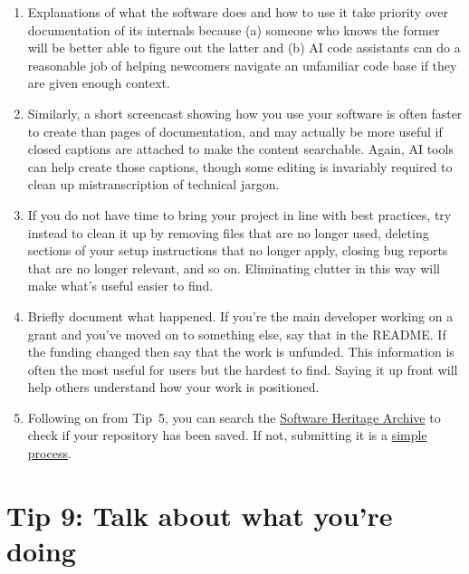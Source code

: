 \documentclass[10pt,letterpaper]{article}
\begin{document}
\begin{enumerate}

\item
  Explanations of what the software does and how to use it
  take priority over documentation of its internals
  because (a) someone who knows the former will be better able to figure out the latter
  and (b) AI code assistants can do a reasonable job of helping newcomers navigate an unfamiliar code base
  if they are given enough context.

\item
  Similarly,
  a short screencast showing how you use your software
  is often faster to create than pages of documentation,
  and may actually be more useful if closed captions are attached
  to make the content searchable.
  Again,
  AI tools can help create those captions,
  though some editing is invariably required to clean up mistranscription of technical jargon.

\item
  If you do not have time to bring your project in line with best practices,
  try instead to clean it up by removing files that are no longer used,
  deleting sections of your setup instructions that no longer apply,
  closing bug reports that are no longer relevant,
  and so on.
  Eliminating clutter in this way will make what's useful easier to find.

\item
  Briefly document what happened.
  If you're the main developer working on a grant and you've moved on to something else,
  say that in the README.
  If the funding changed then say that the work is unfunded.
  This information is often the most useful for users but the hardest to find.
  Saying it up front will help others understand how your work is positioned.

  \item
    Following on from Tip~5,
    you can search the \href{https://archive.softwareheritage.org/browse/search/}{Software Heritage Archive}
    to check if your repository has been saved.
    If not,
    submitting it is a \href{https://archive.softwareheritage.org/save/}{simple process}.

\end{enumerate}

\section*{Tip 9: Talk about what you're doing}
\end{document}
